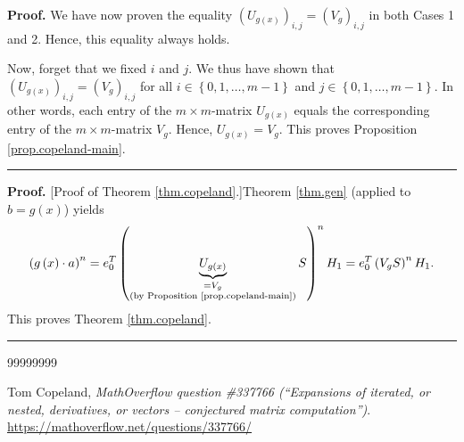 \documentclass[numbers=enddot,12pt,final,onecolumn,notitlepage]{scrartcl}%
\theoremstyle{definition}
\newenvironment{proof}[1][Proof]{\noindent\textbf{#1.} }{\ \rule{0.5em}{0.5em}}
\begin{document}
\begin{proof}
We have now proven the equality $\left(  U_{g\left(  x\right)  }\right)
_{i,j}=\left(  V_{g}\right)  _{i,j}$ in both Cases 1 and 2. Hence, this
equality always holds.

Now, forget that we fixed $i$ and $j$. We thus have shown that $\left(
U_{g\left(  x\right)  }\right)  _{i,j}=\left(  V_{g}\right)  _{i,j}$ for all
$i\in\left\{  0,1,\ldots,m-1\right\}  $ and $j\in\left\{  0,1,\ldots
,m-1\right\}  $. In other words, each entry of the $m\times m$-matrix
$U_{g\left(  x\right)  }$ equals the corresponding entry of the $m\times
m$-matrix $V_{g}$. Hence, $U_{g\left(  x\right)  }=V_{g}$. This proves
Proposition \ref{prop.copeland-main}.
\end{proof}

\begin{proof}
[Proof of Theorem \ref{thm.copeland}.]Theorem \ref{thm.gen} (applied to
$b=g\left(  x\right)  $) yields%
\[
\left(  g\left(  x\right)  \cdot a\right)  ^{n}=e_{0}^{T}\left(
\underbrace{U_{g\left(  x\right)  }}_{\substack{=V_{g}\\\text{(by Proposition
\ref{prop.copeland-main})}}}S\right)  ^{n}H_{1}=e_{0}^{T}\left(
V_{g}S\right)  ^{n}H_{1}.
\]
This proves Theorem \ref{thm.copeland}.
\end{proof}

\begin{thebibliography}{99999999}                                                                                         %


Tom Copeland, \textit{MathOverflow question
\#337766 (\textquotedblleft Expansions of iterated, or nested, derivatives, or
vectors -- conjectured matrix computation\textquotedblright)}. \newline\url{https://mathoverflow.net/questions/337766/}
\end{thebibliography}
\end{document}
